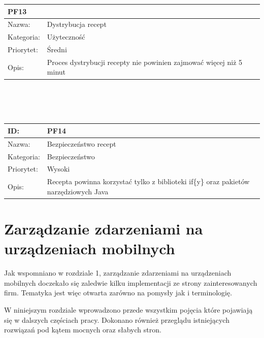 \documentclass[11pt,a4paper,polish,thesis]{dcsbook}
\begin{document}
\begin{tabular}{|p{2cm}|p{12cm}|}
PF13
\\ \hline Nazwa: &
Dystrybucja recept
\\ \hline Kategoria: &
Użyteczność
\\ \hline Priorytet: &
Średni
\\ \hline Opis: &
Proces dystrybucji recepty nie powinien zajmować więcej niż 5 minut
\\ \hline \end{tabular} \\\\\ \begin{tabular}{|p{2cm}|p{12cm}|}  \hline ID: &
PF14
\\ \hline Nazwa: &
Bezpieczeństwo recept
\\ \hline Kategoria: &
Bezpieczeństwo
\\ \hline Priorytet: &
Wysoki
\\ \hline Opis: &
Recepta powinna korzystać tylko z biblioteki if\{y\} oraz pakietów narzędziowych Java
\\ \hline \end{tabular}

\chapter{Zarządzanie zdarzeniami na urządzeniach mobilnych}
Jak wspomniano w rozdziale 1, zarządzanie zdarzeniami na urządzeniach mobilnych doczekało się zaledwie kilku implementacji ze strony zainteresowanych firm.
Tematyka jest więc otwarta zarówno na pomysły jak i terminologię.

W niniejszym rozdziale wprowadzono przede wszystkim pojęcia które pojawiają się w dalszych częściach pracy. Dokonano również przeglądu istniejących rozwiązań
pod kątem mocnych oraz słabych stron.
\end{document}
